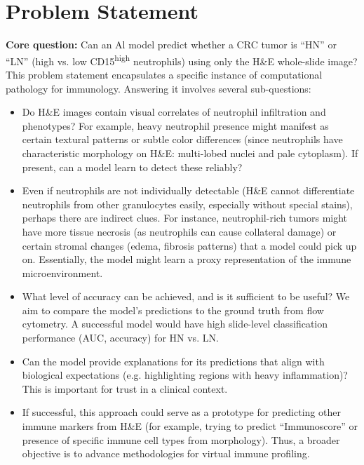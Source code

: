 \section{Problem Statement}
\label{sec:problem}

\textbf{Core question:} Can an Al model predict whether a CRC tumor is ``HN'' or ``LN'' (high vs. low CD15\textsuperscript{high} neutrophils) using only the H\&E whole-slide image? This problem statement encapsulates a specific instance of computational pathology for immunology. Answering it involves several sub-questions:
\begin{itemize}
    \item Do H\&E images contain visual correlates of neutrophil infiltration and phenotypes? For example, heavy neutrophil presence might manifest as certain textural patterns or subtle color differences (since neutrophils have characteristic morphology on H\&E: multi-lobed nuclei and pale cytoplasm). If present, can a model learn to detect these reliably?
    \item Even if neutrophils are not individually detectable (H\&E cannot differentiate neutrophils from other granulocytes easily, especially without special stains), perhaps there are indirect clues. For instance, neutrophil-rich tumors might have more tissue necrosis (as neutrophils can cause collateral damage) or certain stromal changes (edema, fibrosis patterns) that a model could pick up on. Essentially, the model might learn a proxy representation of the immune microenvironment.
    \item What level of accuracy can be achieved, and is it sufficient to be useful? We aim to compare the model's predictions to the ground truth from flow cytometry. A successful model would have high slide-level classification performance (AUC, accuracy) for HN vs. LN.
    \item Can the model provide explanations for its predictions that align with biological expectations (e.g. highlighting regions with heavy inflammation)? This is important for trust in a clinical context.
    \item If successful, this approach could serve as a prototype for predicting other immune markers from H\&E (for example, trying to predict ``Immunoscore'' or presence of specific immune cell types from morphology). Thus, a broader objective is to advance methodologies for virtual immune profiling.
\end{itemize}

